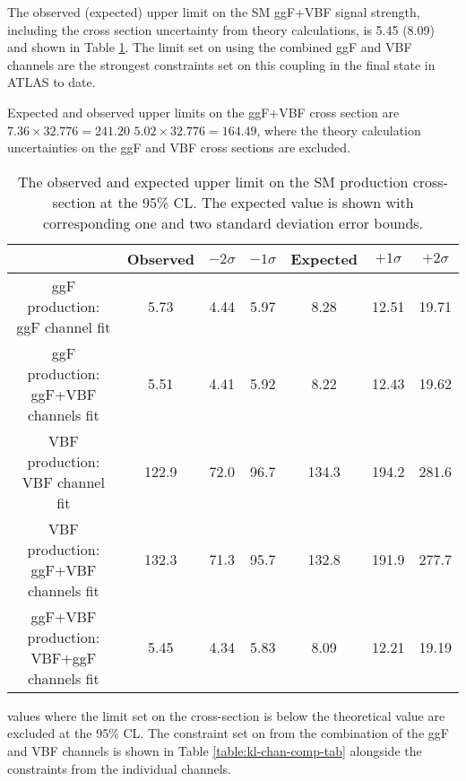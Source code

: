 The observed (expected) upper limit on the SM ggF+VBF signal strength, including the cross section uncertainty from theory calculations, is 5.45 (8.09) and shown in Table \ref{table:ggfvbf-sm-xs-tab}. The limit set on \kl using the combined ggF and VBF channels are the strongest constraints set on this coupling in the \bbbb final state in ATLAS to date. 

Expected and observed upper limits on the ggF+VBF cross section are $7.36 \times 32.776 = 241.20$ $5.02 \times 32.776 = 164.49$, where the theory calculation uncertainties on the ggF and VBF cross sections are excluded.

\begin{table}
	\centering
	\begin{tabular}{c c c c c c c}
		\toprule
		{} & {Observed} & {$-2\sigma$} & {$-1\sigma$} & {Expected} & {$+1\sigma$} & {$+2\sigma$}\\
		\midrule
		{ggF production: ggF channel fit} & {5.73}  & {4.44} & {5.97} & {8.28} & {12.51} & {19.71}  \\
		{ggF production: ggF+VBF channels fit} & {5.51}  & {4.41} & {5.92} & {8.22} & {12.43} & {19.62}  \\
		{VBF production: VBF channel fit} & {122.9}  & {72.0} & {96.7} & {134.3} & {194.2} & {281.6}  \\
		{VBF production: ggF+VBF channels fit} & {132.3}  & {71.3} & {95.7} & {132.8} & {191.9} & {277.7}  \\
		{ggF+VBF production: VBF+ggF channels fit} & {5.45} & {4.34} & {5.83} & {8.09} & {12.21} & {19.19} \\
		\bottomrule
	\end{tabular}
	\caption{The observed and expected upper limit on the SM \HH production cross-section at the 95\% CL. The expected value is shown with corresponding one and two standard deviation error bounds.}
\label{table:ggfvbf-sm-xs-tab}
\end{table}


\kl values where the limit set on the cross-section is below the theoretical value are excluded at the 95\% CL. The constraint set on \kl from the combination of the ggF and VBF channels is shown in Table \ref{table:kl-chan-comp-tab} alongside the constraints from the individual channels.



